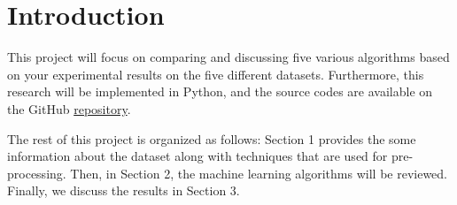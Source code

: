 \documentclass[12pt]{article}
\begin{document}
\section*{Introduction}
\vspace{2cm}
This project will focus on comparing and discussing five various algorithms based on your experimental results on the five different datasets. Furthermore, this research will be implemented in Python, and the source codes are available on the GitHub \href{https://github.com/SKazemii/CS6735}{ repository}. 

The rest of this project is organized as follows: Section 1 provides the some information about the dataset along with techniques that are used for pre-processing. Then, in Section 2, the machine learning algorithms will be reviewed. Finally, we discuss the results in Section 3.
\newpage
\end{document}
